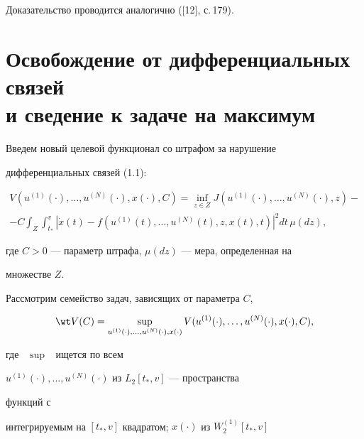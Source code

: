  


 


Доказательство проводится аналогично ([12], с.\,179). 


 


 


\section{Освобождение от дифференциальных связей\protect\\ 


и сведение к задаче на максимум} 


 


Введем новый целевой функционал со штрафом за нарушение 


дифференциальных связей (1.1): 


\begin{multline} 


V(u^{(1)}(\cdot),\dotsc,u^{(N)}(\cdot),x(\cdot),C)=\inf_{z\in Z} 


J(u^{(1)}(\cdot),\dotsc,u^{(N)}(\cdot),z)- \\ 


-C\int_Z\int^v_{t_*}|\Dot x(t)-f(u^{(1)}(t),\dotsc,u^{(N)}(t), 


z,x(t),t)|^2dt\,\mu(dz), 


\end{multline} 


где $C>0$ --- параметр штрафа, $\mu(dz)$ --- мера, определенная на 


множестве $Z$. 


 


Рассмотрим семейство задач, зависящих от параметра $C$, 


\begin{equation} 


\wt V(C)=\sup_{u^{(1)}(\cdot),\dotsc,u^{(N)}(\cdot),x(\cdot)} 


V(u^{(1)}(\cdot),\dotsc,u^{(N)}(\cdot),x(\cdot),C), 


\end{equation} 


где \ $\sup$ \ ищется по всем 


$u^{(1)}(\cdot),\dotsc,u^{(N)}(\cdot)$ из $L_2[t_*,v]$ --- пространства 


функций с 


интегрируемым на $[t_*,v]$ квадратом; $x(\cdot)$ из $W^{(1)}_2[t_*,v]$ 


